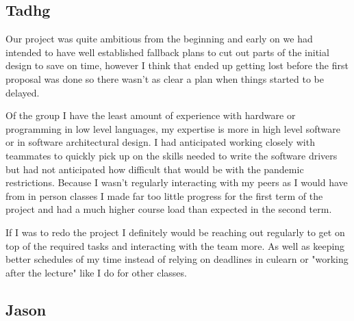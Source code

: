 \subsection{Tadhg}

Our project was quite ambitious from the beginning and early on we had intended to have 
well established fallback plans to cut out parts of the initial design to save on time,
however I think that ended up getting lost before the first proposal was done so there wasn't
as clear a plan when things started to be delayed.

Of the group I have the least amount of experience with hardware or programming in low level
languages, my expertise is more in high level software or in software architectural design.
I had anticipated working closely with teammates to quickly pick up on the skills needed to 
write the software drivers but had not anticipated how difficult that would be with the pandemic
restrictions.  Because I wasn't regularly interacting with my peers as I would have from in person
classes I made far too little progress for the first term of the project and had a much higher
course load than expected in the second term.  

If I was to redo the project I definitely would be reaching out regularly to get on top of
the required tasks and interacting with the team more. As well as keeping better schedules of my time
instead of relying on deadlines in culearn or "working after the lecture" like I do for other classes.
\subsection{Jason}

